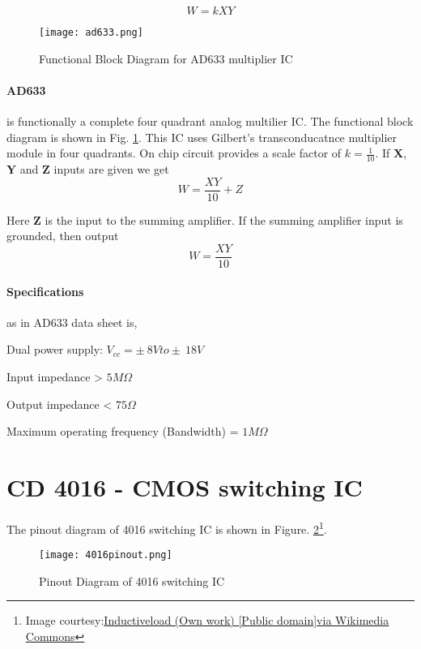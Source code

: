 \begin{equation}
W=kXY
\end{equation}

\begin{figure}[h]
\texttt{[image: ad633.png]}
\caption{Functional Block Diagram for AD633 multiplier IC}
\label{ad633}
\end{figure}

\paragraph{AD633} is functionally a complete four quadrant analog multilier IC. The functional block diagram is shown in Fig. \ref{ad633}. This IC uses Gilbert's transconducatnce multiplier module in four quadrants. On chip circuit provides a scale factor of $k=\frac{1}{10}$. If $\textbf{X}$, $\textbf{Y}$ and $\textbf{Z}$ inputs are given we get 
\begin{equation}
W=\frac{XY}{10}+Z
\end{equation}

Here $\textbf{Z}$ is the input to the summing amplifier. If the summing amplifier input is grounded, then output 
\begin{equation}
W=\frac{XY}{10}
\end{equation}

\paragraph{Specifications}as in AD633 data sheet is,

\noindent Dual power supply: $V_{cc}= \pm \ 8V to \pm \ 18V$

\noindent Input impedance > $5 M \Omega$

\noindent Output impedance < $75  \Omega$

\noindent Maximum operating frequency (Bandwidth) = $1 M\Omega$

\section{CD 4016 - CMOS switching IC}
The pinout diagram of 4016 switching IC is shown in Figure. \ref{4016pin}\footnote{Image courtesy:\href{http://commons.wikimedia.org/wiki/File\%3A4016\_Pinout.svg}{Inductiveload (Own work) [Public domain]via Wikimedia Commons}}.
\begin{figure}
\texttt{[image: 4016pinout.png]}
\caption{Pinout Diagram of 4016 switching IC}
\label{4016pin}
\end{figure}





